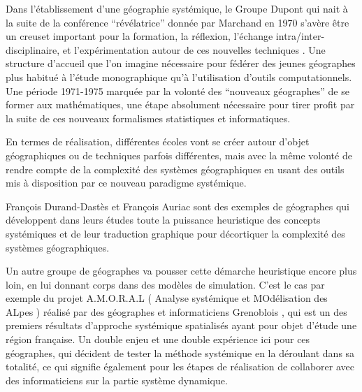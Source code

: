 
Dans l'établissement d'une géographie systémique, le Groupe Dupont qui nait à la suite de la conférence \enquote{révélatrice} donnée par Marchand en 1970 s'avère être un creuset important pour la formation, la réflexion, l'échange intra/inter-disciplinaire, et l'expérimentation autour de ces nouvelles techniques \autocites[2]{LeBerre1987}[125-128]{Pumain2002}. Une structure d'accueil que l'on imagine nécessaire pour fédérer des jeunes géographes plus habitué à l'étude monographique qu'à l'utilisation d'outils computationnels. Une période 1971-1975 marquée par la volonté des \enquote{nouveaux géographes} de se former aux mathématiques, une étape absolument nécessaire pour tirer profit par la suite de ces nouveaux formalismes statistiques et informatiques. 

En termes de réalisation, différentes écoles vont se créer autour d'objet géographiques ou de techniques parfois différentes, mais avec la même volonté de rendre compte de la complexité des systèmes géographiques en usant des outils mis à disposition par ce nouveau paradigme systémique.

François Durand-Dastès et François Auriac sont des exemples de géographes qui développent dans leurs études toute la puissance heuristique des concepts systémiques et de leur traduction graphique pour décortiquer la complexité des systèmes géographiques.

Un autre groupe de géographes va pousser cette démarche heuristique encore plus loin, en lui donnant corps dans des modèles de simulation. C'est le cas par exemple du projet A.M.O.R.A.L ( Analyse systémique et MOdélisation des ALpes ) réalisé par des géographes et informaticiens Grenoblois \autocite{1984}, qui est un des premiers résultats d'approche systémique spatialisés ayant pour objet d'étude une région française. Un double enjeu et une double expérience ici pour ces géographes, qui décident de tester la méthode systémique en la déroulant dans sa totalité, ce qui signifie également pour les étapes de réalisation de collaborer avec des informaticiens sur la partie système dynamique. \autocite{Guermond1984, LeBerre1987}


